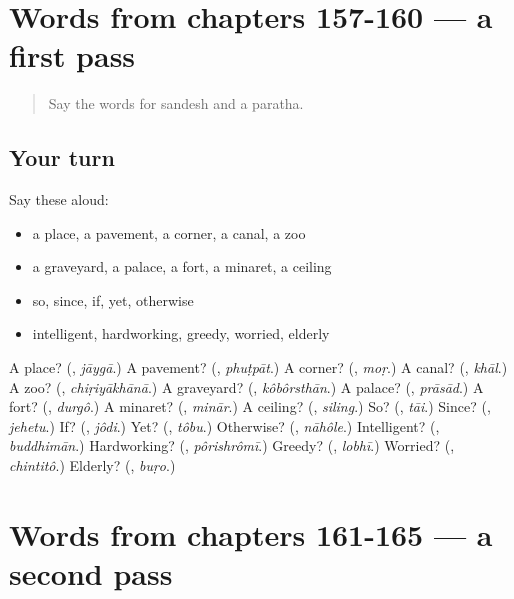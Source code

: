 \section[(dialogue)]{Words from chapters 157-160 — a first pass}

\label{lesson:BN-R165-first-pass-words-from-chapters-157-160}



\begin{quote}
Say the words for sandesh and a paratha.
\end{quote}

\subsection*{Your turn}
Say these aloud:

\begin{itemize}
\raggedright
  \item a place, a pavement, a corner, a canal, a zoo
  \item a graveyard, a palace, a fort, a minaret, a ceiling
  \item so, since, if, yet, otherwise
  \item intelligent, hardworking, greedy, worried, elderly
\end{itemize}

\begin{tcolorbox}[breakable,colback=teal!4,colframe=teal!35!black,title={Before you move on}]
A place? (\textbf{}, \emph{jāygā}.) A pavement? (\textbf{}, \emph{phuṭpāt}.) A corner? (\textbf{}, \emph{moṛ}.) A canal? (\textbf{}, \emph{khāl}.) A zoo? (\textbf{}, \emph{chiṛiyākhānā}.) A graveyard? (\textbf{}, \emph{kôbôrsthān}.) A palace? (\textbf{}, \emph{prāsād}.) A fort? (\textbf{}, \emph{durgô}.) A minaret? (\textbf{}, \emph{minār}.) A ceiling? (\textbf{}, \emph{siling}.) So? (\textbf{}, \emph{tāi}.) Since? (\textbf{}, \emph{jehetu}.) If? (\textbf{}, \emph{jôdi}.) Yet? (\textbf{}, \emph{tôbu}.) Otherwise? (\textbf{}, \emph{nāhôle}.) Intelligent? (\textbf{}, \emph{buddhimān}.) Hardworking? (\textbf{}, \emph{pôrishrômī}.) Greedy? (\textbf{}, \emph{lobhī}.) Worried? (\textbf{}, \emph{chintitô}.) Elderly? (\textbf{}, \emph{buṛo}.)
\end{tcolorbox}
\section[(dialogue)]{Words from chapters 161-165 — a second pass}

